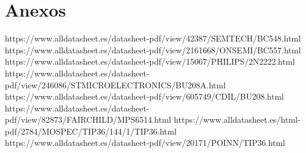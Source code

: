 \chapter{Anexos}
  
    https://www.alldatasheet.es/datasheet-pdf/view/42387/SEMTECH/BC548.html
    https://www.alldatasheet.es/datasheet-pdf/view/2161668/ONSEMI/BC557.html
    https://www.alldatasheet.es/datasheet-pdf/view/15067/PHILIPS/2N2222.html
    https://www.alldatasheet.es/datasheet-pdf/view/246086/STMICROELECTRONICS/BU208A.html
    https://www.alldatasheet.es/datasheet-pdf/view/605749/CDIL/BU208.html
    https://www.alldatasheet.es/datasheet-pdf/view/82873/FAIRCHILD/MPS6514.html
    https://www.alldatasheet.es/html-pdf/2784/MOSPEC/TIP36/144/1/TIP36.html
    https://www.alldatasheet.es/datasheet-pdf/view/20171/POINN/TIP36.html
